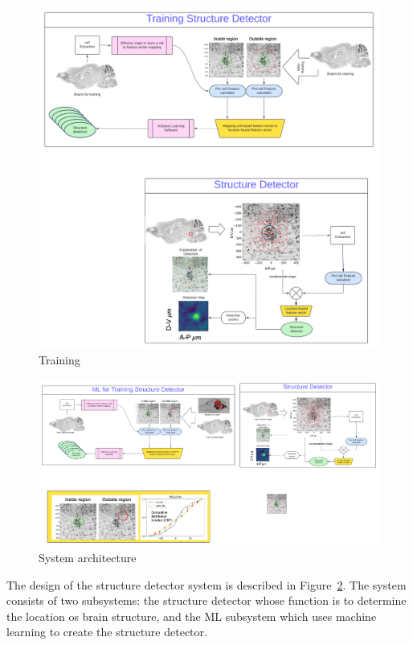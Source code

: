 \documentclass[runningheads]{llncs}
\begin{document}
\begin{figure}[t]
  \includegraphics[width=\textwidth]{figures/Training.pdf}
  \caption{Training \label{fig:training}}
\end{figure}
\fi

\begin{figure}[t]
  \includegraphics[width=\textwidth]{figures/architecture.pdf}
  \caption{System architecture \label{fig:architecture}}
\end{figure}

The design of the structure detector system is described in Figure~\ref{fig:architecture}.
The system consists of two subsystems: the structure detector whose
function is to determine the location os brain structure, and the ML
subsystem which uses machine learning to create the structure detector.
\end{document}
